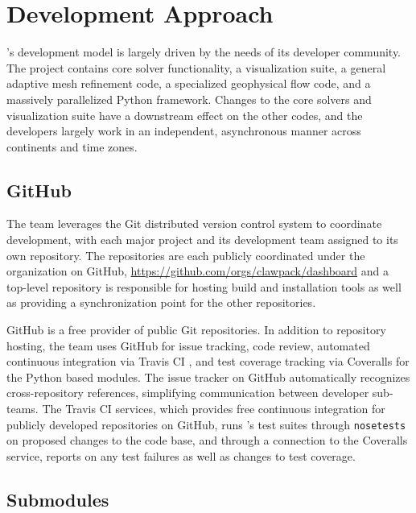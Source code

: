 %
%
%

\section{Development Approach}

\clawpack's development model is largely driven by the needs of its
developer community.  The \clawpack project contains core solver
functionality, a visualization suite, a general adaptive mesh
refinement code, a specialized geophysical flow code, and a
massively parallelized Python framework.  Changes to the core solvers
and visualization suite have a downstream effect on the other codes,
and the developers largely work in an independent, asynchronous manner
across continents and time zones. 

\subsection{GitHub}

The \clawpack team leverages the Git distributed version control system
to coordinate development, with each major project and its development
team assigned to its own repository.  The repositories are each
publicly coordinated under the \clawpack organization on GitHub, 
\url{https://github.com/orgs/clawpack/dashboard} and a
top-level \clawpack repository is responsible for hosting
build and installation tools as well as providing a synchronization
point for the other repositories.

GitHub is a free provider of public Git repositories.  In addition to
repository hosting, the \clawpack team uses GitHub for issue tracking,
code review, automated continuous integration via Travis CI \cite{travis}, 
and test coverage tracking via Coveralls \cite{coveralls} for the Python based modules.  
The issue tracker on GitHub
automatically recognizes cross-repository references, simplifying
communication between \clawpack developer sub-teams.  The Travis CI
services, which provides free continuous integration for publicly
developed repositories on GitHub, runs \clawpack's test suites through 
\texttt{nosetests} \cite{nosetests} on
proposed changes to the code base, and through a connection to
the Coveralls service, reports on any test failures as well as changes
to test coverage.

\subsection{Submodules}


